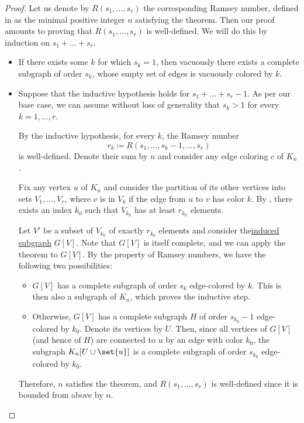 \begin{proof}
  Let us denote by \( R(s_1, \ldots, s_r) \) the corresponding Ramsey number, defined in  as the minimal positive integer \( n \) satisfying the theorem. Then our proof amounts to proving that \( R(s_1, \ldots, s_r) \) is well-defined. We will do this by induction on \( s_1 + \ldots + s_r \).

  \begin{itemize}
    \item If there exists some \( k \) for which \( s_k = 1 \), then vacuously there exists a complete subgraph of order \( s_k \), whose empty set of edges is vacuously colored by \( k \).

    \item Suppose that the inductive hypothesis holds for \( s_1 + \ldots + s_r - 1 \). As per our base case, we can assume without loss of generality that \( s_k > 1 \) for every \( k = 1, \ldots, r \).

    By the inductive hypothesis, for every \( k \), the Ramsey number
    \begin{equation*}
      r_k \coloneqq R(s_1, \ldots, s_k - 1, \ldots, s_r)
    \end{equation*}
    is well-defined. Denote their sum by \( n \) and consider any edge coloring \( c \) of \( K_n \).

    Fix any vertex \( u \) of \( K_n \) and consider the partition of its other vertices into sets \( V_1, \ldots, V_r \), where \( v \) is in \( V_k \) if the edge from \( u \) to \( v \) has color \( k \). By , there exists an index \( k_0 \) such that \( V_{k_0} \) has at least \( r_{k_0} \) elements.

    Let \( V' \) be a subset of \( V_{k_0} \) of exactly \( r_{k_0} \) elements and consider the\hyperref[def:induced_subgraph]{induced subgraph} \( G[V] \). Note that \( G[V] \) is itself complete, and we can apply the theorem to \( G[V] \). By the property of Ramsey numbers, we have the following two possibilities:
    \begin{itemize}
      \item \( G[V] \) has a complete subgraph of order \( s_k \) edge-colored by \( k \). This is then also a subgraph of \( K_n \), which proves the inductive step.

      \item Otherwise, \( G[V] \) has a complete subgraph \( H \) of order \( s_{k_0} - 1 \) edge-colored by \( k_0 \). Denote its vertices by \( U \). Then, since all vertices of \( G[V] \) (and hence of \( H \)) are connected to \( u \) by an edge with color \( k_0 \), the subgraph \( K_n[U \cup \set{ u }] \) is a complete subgraph of order \( s_{k_0} \) edge-colored by \( k_0 \).
    \end{itemize}

    Therefore, \( n \) satisfies the theorem, and \( R(s_1, \ldots, s_r) \) is well-defined since it is bounded from above by \( n \).
  \end{itemize}
\end{proof}

